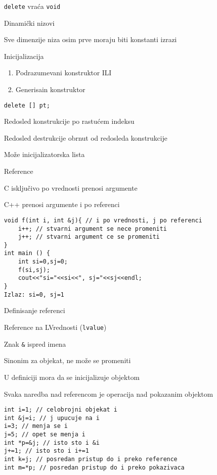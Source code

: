 \documentclass{article}
\newenvironment{xitemize}{%
    
    \itemize
    \larger
}{%
    \enditemize
}
\let\olditemize\itemize
\let\endolditemize\enditemize
\renewenvironment{itemize}{%
    \smaller
    \olditemize
}{%
    \endolditemize
}
\providecommand{\inlinecode}[1]{\texttt{#1}}
\begin{document}
\begin{xitemize}
\begin{itemize}
\begin{enumerate}
    \end{enumerate}
    \item \inlinecode {delete} vraća \inlinecode {void}
\end{itemize}
\item Dinamički nizovi
\begin{itemize}
    \item Sve dimenzije niza osim prve moraju biti konstanti izrazi
    \item Inicijalizacija
    \begin{enumerate}
        \item Podrazumevani konstruktor ILI
        \item Generisain konstruktor
    \end{enumerate}
    \inlinecode{delete [] pt;}
    \item Redosled konstrukcije po rastućem indeksu
    \item Redosled destrukcije obrnut od redosleda konstrukcije
    \item Može inicijalizatorska lista
\end{itemize}


\item Reference
\begin{itemize}
    \item C isključivo po vrednosti prenosi argumente
    \item C++ prenosi argumente i po referenci
    \begin{lstlisting}
void f(int i, int &j){ // i po vrednosti, j po referenci
    i++; // stvarni argument se nece promeniti
    j++; // stvarni argument ce se promeniti
}
int main () {
    int si=0,sj=0;
    f(si,sj);
    cout<<"si="<<si<<", sj="<<sj<<endl;
}
Izlaz: si=0, sj=1
    \end{lstlisting}
\end{itemize}
\item Definisanje referenci
\begin{itemize}
    \item Reference na LVrednosti (\inlinecode {lvalue})
    \item Znak \inlinecode\& ispred imena
    \item Sinonim za objekat, ne može se promeniti
    \item U definiciji mora da se inicijalizuje objektom
    \item Svaka naredba nad referencom je operacija nad pokazanim objektom
    \begin{lstlisting}
int i=1; // celobrojni objekat i
int &j=i; // j upucuje na i
i=3; // menja se i
j=5; // opet se menja i
int *p=&j; // isto sto i &i
j+=1; // isto sto i i+=1
int k=j; // posredan pristup do i preko reference
int m=*p; // posredan pristup do i preko pokazivaca
    \end{lstlisting}
\end{itemize}



\end{xitemize}
\end{document}
